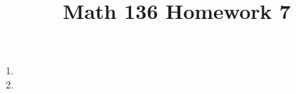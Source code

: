 \documentclass{article}
\title{Math 136 Homework 7}
\begin{document}
    \maketitle
    \begin{enumerate}
      \item 
      \item 
    \end{enumerate}
\end{document}
